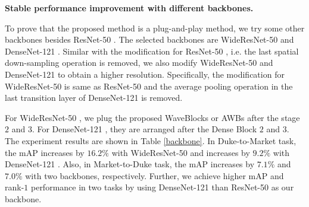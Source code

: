 \documentclass[journal]{IEEEtran}
\begin{document}
\textbf{Stable performance improvement with different backbones.}\par 
To prove that the proposed method is a plug-and-play method, we try some other backbones besides ResNet-50 \cite{he2016deep}. The selected backbones are WideResNet-50 \cite{zagoruyko2016wide} and DenseNet-121 \cite{huang2017densely}. Similar with the modification for ResNet-50 \cite{he2016deep}, i.e. the last spatial down-sampling operation is removed, we also modify  WideResNet-50 \cite{zagoruyko2016wide} and DenseNet-121 \cite{huang2017densely} to obtain a higher resolution. Specifically, the modification for WideResNet-50 \cite{zagoruyko2016wide} is same as ResNet-50 \cite{he2016deep} and the average pooling operation in the last transition layer of DenseNet-121 \cite{huang2017densely} is removed. \par 
For WideResNet-50 \cite{zagoruyko2016wide}, we plug the proposed WaveBlocks or AWBs after the stage $2$ and $3$. For DenseNet-121 \cite{huang2017densely}, they are arranged after the Dense Block $2$ and $3$. The experiment results are shown in Table \ref{backbone}. In Duke-to-Market task, the mAP increases by $16.2\%$ with WideResNet-50 \cite{zagoruyko2016wide} and increases by $9.2\%$ with DenseNet-121 \cite{huang2017densely}. Also, in Market-to-Duke task, the mAP increases by $7.1\%$ and $7.0\%$ with two backbones, respectively. Further, we achieve higher mAP and rank-$1$ performance in two tasks by using DenseNet-121 \cite{huang2017densely} than ResNet-50 \cite{huang2017densely} as our backbone.
\end{document}
